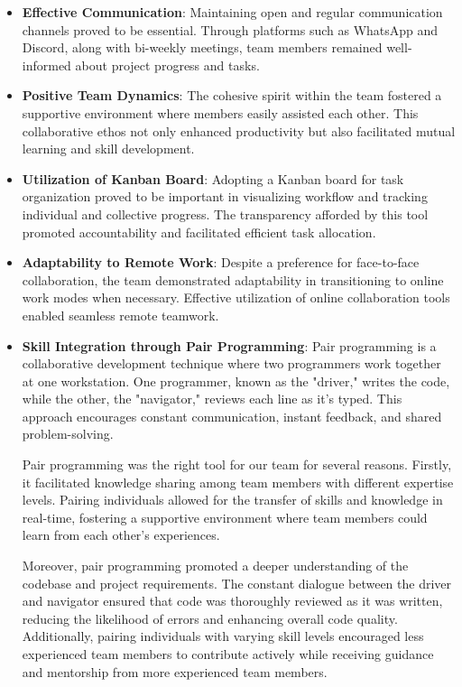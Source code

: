 \begin{itemize}
    \item \textbf{Effective Communication}: Maintaining open and regular communication channels proved to be essential. Through platforms such as WhatsApp and Discord, along with bi-weekly meetings, team members remained well-informed about project progress and tasks.

    \item \textbf{Positive Team Dynamics}: The cohesive spirit within the team fostered a supportive environment where members easily assisted each other. This collaborative ethos not only enhanced productivity but also facilitated mutual learning and skill development.

    \item \textbf{Utilization of Kanban Board}: Adopting a Kanban board for task organization proved to be important in visualizing workflow and tracking individual and collective progress. The transparency afforded by this tool promoted accountability and facilitated efficient task allocation.

    \item \textbf{Adaptability to Remote Work}: Despite a preference for face-to-face collaboration, the team demonstrated adaptability in transitioning to online work modes when necessary. Effective utilization of online collaboration tools enabled seamless remote teamwork.

    \item \textbf{Skill Integration through Pair Programming}: Pair programming is a collaborative development technique where two programmers work together at one workstation. One programmer, known as the "driver," writes the code, while the other, the "navigator," reviews each line as it's typed. This approach encourages constant communication, instant feedback, and shared problem-solving.

    Pair programming was the right tool for our team for several reasons. Firstly, it facilitated knowledge sharing among team members with different expertise levels. Pairing individuals allowed for the transfer of skills and knowledge in real-time, fostering a supportive environment where team members could learn from each other's experiences.

    Moreover, pair programming promoted a deeper understanding of the codebase and project requirements. The constant dialogue between the driver and navigator ensured that code was thoroughly reviewed as it was written, reducing the likelihood of errors and enhancing overall code quality. Additionally, pairing individuals with varying skill levels encouraged less experienced team members to contribute actively while receiving guidance and mentorship from more experienced team members.
\end{itemize}


